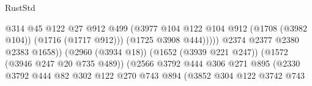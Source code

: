 \begin{lexlean}{RustStd}
\begin{coremodule}
                                                            @314
                                                            @45
                                                            @122
                                                            @27
                                                            @912
                                                            @499
                                                            (@3977
                                                              @104
                                                              @122
                                                              @104
                                                              @912
                                                              (@1708 (@3982 @104))
                                                              (@1716 (@1717 @912)))
                                                            (@1725 @3908 @444)))))
                                                    @2374
                                                    @2377
                                                    @2380
                                                    @2383
                                                    @1658))
                                                (@2960 (@3934 @18))
                                                (@1652 (@3939 @221 @247))
                                                (@1572 (@3946 @247 @20 @735 @489))
                                                (@2566
                                                  @3792
                                                  @444
                                                  @306
                                                  @271
                                                  @895
                                                  (@2330
                                                    @3792
                                                    @444
                                                    @82
                                                    @302
                                                    @122
                                                    @270
                                                    @743
                                                    @894
                                                    (@3852
                                                      @304
                                                      @122
                                                      @3742
                                                      @743

\end{coremodule}
\end{lexlean}
